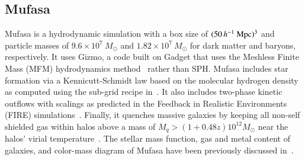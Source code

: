 \documentclass[tighten, preprint]{aastex62}
\begin{document}
\subsection{{\sc Mufasa}} \label{sec:mufasa}
{\color{red}
{\sc Mufasa} is a hydrodynamic simulation with a box size of 
$(50\,h^{-1}\ {\rm Mpc})^3$ and particle masses of $9.6 \times 10^7\ M_{\odot}$ 
and $1.82 \times 10^7\ M_{\odot}$ for dark matter and baryons, respectively. 
It  uses {\sc Gizmo}, a code built on {\sc Gadget} that uses the Meshless 
Finite Mass (MFM) hydrodynamics method~\citep{hopkins2015a} rather than SPH.}  %
{\sc Mufasa} includes star formation via a Kennicutt-Schmidt law based on the  molecular hydrogen 
density as computed using the sub-grid recipe in~\cite{krumholz2011}. 
It also includes two-phase kinetic outflows with scalings as predicted 
in the Feedback in Realistic Environments (FIRE) simulations~\citep{muratov2015}.
Finally, it quenches massive galaxies by keeping all non-self shielded 
gas within halos above a mass of $M_q>(1+0.48z)10^{12}M_\odot$%
near the halos' virial temperature~\citep{gabor2015, mitra2015}. The stellar mass 
function, gas and metal content of galaxies, and color-mass 
diagram of {\sc Mufasa} have been previously discussed 
in~\citet{dave2016,dave2017,dave2017b}.
\end{document}
